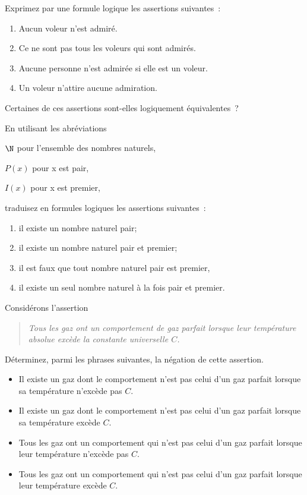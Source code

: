 \documentclass[12pt,french,oneside,a4paper]{memoir} %
\begin{document}
\begin{exo}
Exprimez par une formule logique les assertions suivantes~: 
\begin{enumerate}
\item Aucun voleur n'est admiré.
\item Ce ne sont pas tous les voleurs qui sont admirés.
\item Aucune personne n'est admirée si elle est un voleur.
\item Un voleur n'attire aucune admiration.
\end{enumerate}
\noindent Certaines de ces assertions sont-elles logiquement équivalentes~?
\end{exo}

\begin{exo}
En utilisant les abréviations

$\N$ pour l'ensemble des nombres naturels,
 
$P(x)$ pour \og x est pair\fg{},

$I(x)$ pour \og x est premier\fg{},

\noindent traduisez en formules logiques les assertions suivantes~: 

\begin{enumerate}
\item il existe un nombre naturel pair; 
\item il existe un nombre naturel pair et premier; 
\item il est faux que tout nombre naturel pair est premier, 
\item il existe un seul nombre naturel à la fois pair et premier.
\end{enumerate}
\end{exo}

\begin{exo}
Considérons l'assertion
\begin{quote}\slshape
Tous les gaz ont un comportement de gaz parfait lorsque leur
température absolue excède la constante universelle $C$.
\end{quote}

Déterminez, parmi les phrases suivantes, la négation de cette assertion.

\begin{itemize}
\item  Il existe un gaz dont le comportement n'est pas celui d'un gaz
parfait lorsque sa température n'excède pas $C$.

\item Il existe un gaz dont le comportement n'est pas celui d'un gaz
parfait lorsque sa température excède  $C$.

\item Tous les gaz ont un comportement qui n'est pas celui d'un gaz
parfait lorsque leur température n'excède pas $C$.

\item Tous les gaz ont un comportement qui n'est pas celui d'un gaz
parfait lorsque leur température excède $C$.
\end{itemize}
\end{exo}
\end{document}
